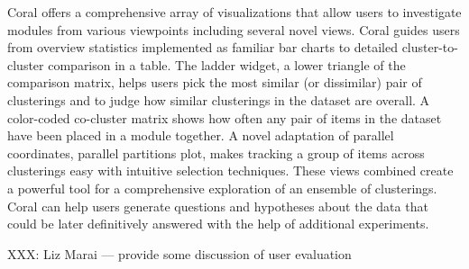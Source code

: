 \documentclass[12pt]{cmuthesis}
\newcommand\Coral{Coral\xspace}
\begin{document}
  \Coral offers a comprehensive array of visualizations that allow users to investigate modules from various viewpoints including several novel views. \Coral guides users from overview statistics implemented as familiar bar charts to detailed cluster-to-cluster comparison in a table. The ladder widget, a lower triangle of the comparison matrix, helps users pick the most similar (or dissimilar) pair of clusterings and to judge how similar clusterings in the dataset are overall. A color-coded co-cluster matrix shows how often any pair of items in the dataset have been placed in a module together. A novel adaptation of parallel coordinates, parallel partitions plot, makes tracking a group of items across clusterings easy with intuitive selection techniques. These views combined create a powerful tool for a comprehensive exploration of an ensemble of clusterings. \Coral can help users generate questions and hypotheses about the data that could be later definitively answered with the help of additional experiments.

  XXX: Liz Marai --- provide some discussion of user evaluation






\end{document}

